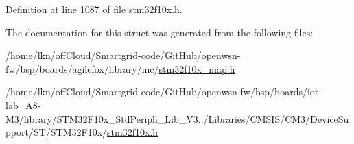Definition at line 1087 of file stm32f10x.\+h.



The documentation for this struct was generated from the following files\+:\begin{DoxyCompactItemize}
\item 
/home/lkn/off\+Cloud/\+Smartgrid-\/code/\+Git\+Hub/openwsn-\/fw/bsp/boards/agilefox/library/inc/\hyperlink{agilefox_2library_2inc_2stm32f10x__map_8h}{stm32f10x\+\_\+map.\+h}\item 
/home/lkn/off\+Cloud/\+Smartgrid-\/code/\+Git\+Hub/openwsn-\/fw/bsp/boards/iot-\/lab\+\_\+\+A8-\/\+M3/library/\+S\+T\+M32\+F10x\+\_\+\+Std\+Periph\+\_\+\+Lib\+\_\+\+V3../\+Libraries/\+C\+M\+S\+I\+S/\+C\+M3/\+Device\+Support/\+S\+T/\+S\+T\+M32\+F10x/\hyperlink{iot-lab___a8-_m3_2library_2_s_t_m32_f10x___std_periph___lib___v3_85_80_2_libraries_2_c_m_s_i_s_26497265545392eb5694b064ae15018db}{stm32f10x.\+h}\end{DoxyCompactItemize}
